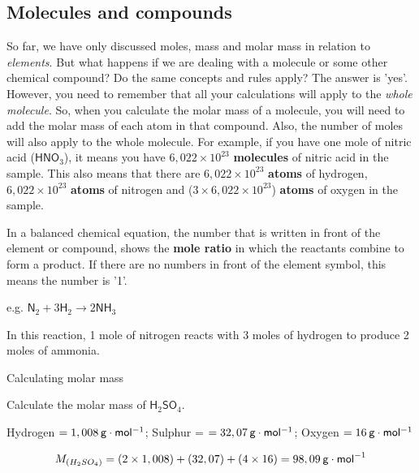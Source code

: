             \subsection*{Molecules and compounds}
            \nopagebreak
      \label{m38717*id278284}So far, we have only discussed moles, mass and molar mass in relation to \textsl{elements}. But what happens if we are dealing with a molecule or some other chemical compound? Do the same concepts and rules apply? The answer is 'yes'. However, you need to remember that all your calculations will apply to the \textsl{whole molecule}. So, when you calculate the molar mass of a molecule, you will need to add the molar mass of each atom in that compound. Also, the number of moles will also apply to the whole molecule. For example, if you have one mole of nitric acid ($\mathsf{HNO}{}_{3}$), it means you have $6,022\ensuremath{\times}{10}^{23}$ \textbf{molecules} of nitric acid in the sample. This also means that there are $6,022\ensuremath{\times}{10}^{23}$ \textbf{atoms} of hydrogen, $6,022\ensuremath{\times}{10}^{23}$ \textbf{atoms} of nitrogen and ($3\ensuremath{\times}6,022\ensuremath{\times}{10}^{23}$) \textbf{atoms} of oxygen in the sample.\par 
      \label{m38717*id278429}In a balanced chemical equation, the number that is written in front of the element or compound, shows the \textbf{mole ratio} in which the reactants combine to form a product. If there are no numbers in front of the element symbol, this means the number is '1'.\par 
      \label{m38717*id278442}e.g. ${\mathsf{N}}_{2}+3{\mathsf{H}}_{2}\to 2\mathsf{N}{\mathsf{H}}_{3}$\par 
      \label{m38717*id278488}In this reaction, 1 mole of nitrogen reacts with 3 moles of hydrogen to produce 2 moles of ammonia.\par 
\label{m38717*secfhsst!!!underscore!!!id566}\vspace{.5cm} 
      \begin{wex}{Calculating molar mass }{
      \label{m38717*probfhsst!!!underscore!!!id567}
      \label{m38717*id278505}Calculate the molar mass of $\mathsf{H}{}_{2}\mathsf{SO}{}_{4}$.\par 
      \vspace{5pt}}
{
      \label{m38717*id278575}Hydrogen $=1,008\phantom{\rule{2pt}{0ex}}\mathsf{g}\ensuremath{\cdot}\mathsf{mol}{}^{-1}$; Sulphur = $=32,07\phantom{\rule{2pt}{0ex}}\mathsf{g}\ensuremath{\cdot}\mathsf{mol}{}^{-1}$; Oxygen $=16\phantom{\rule{2pt}{0ex}}\mathsf{g}\ensuremath{\cdot}\mathsf{mol}{}^{-1}$\par 
      \label{m38717*id278632}\nopagebreak\noindent{}
    \begin{equation}
    {M}_{\left({H}_{2}S{O}_{4}\right)}=\left(2\ensuremath{\times}1,008\right)+\left(32,07\right)+\left(4\ensuremath{\times}16\right)=98,09\phantom{\rule{2pt}{0ex}}\mathsf{g}\ensuremath{\cdot}{\mathsf{mol}}^{-1}
      \end{equation}
}
    \end{wex}
